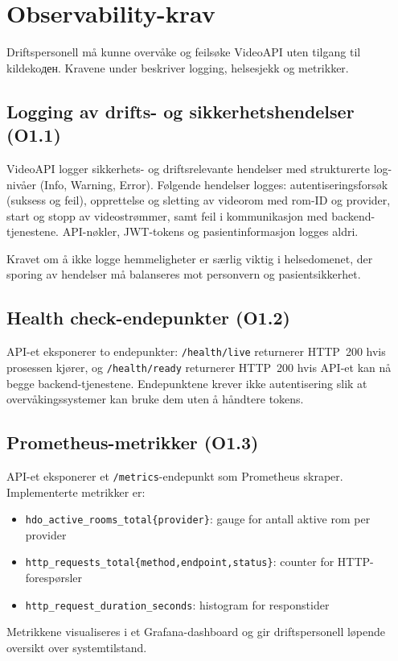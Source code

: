 \section{Observability-krav}
\label{sec:krav-observability}

Driftspersonell må kunne overvåke og feilsøke VideoAPI uten 
tilgang til kildekoден. Kravene under beskriver logging, 
helsesjekk og metrikker.

\subsection{Logging av drifts- og sikkerhetshendelser (O1.1)}
\label{subsec:krav-o11}

VideoAPI logger sikkerhets- og driftsrelevante hendelser med 
strukturerte log-nivåer (Info, Warning, Error). Følgende 
hendelser logges: autentiseringsforsøk (suksess og feil), 
opprettelse og sletting av videorom med rom-ID og provider, 
start og stopp av videostrømmer, samt feil i kommunikasjon 
med backend-tjenestene. API-nøkler, JWT-tokens og 
pasientinformasjon logges aldri.

Kravet om å ikke logge hemmeligheter er særlig viktig i 
helsedomenet, der sporing av hendelser må balanseres mot 
personvern og pasientsikkerhet.

\subsection{Health check-endepunkter (O1.2)}
\label{subsec:krav-o12}

API-et eksponerer to endepunkter: \texttt{/health/live} 
returnerer HTTP~200 hvis prosessen kjører, og 
\texttt{/health/ready} returnerer HTTP~200 hvis API-et 
kan nå begge backend-tjenestene. Endepunktene krever ikke 
autentisering slik at overvåkingssystemer kan bruke dem 
uten å håndtere tokens.

\subsection{Prometheus-metrikker (O1.3)}
\label{subsec:krav-o13}

API-et eksponerer et \texttt{/metrics}-endepunkt som 
Prometheus skraper. Implementerte metrikker er:

\begin{itemize}
    \item \texttt{hdo\_active\_rooms\_total\{provider\}}: 
          gauge for antall aktive rom per provider
    \item \texttt{http\_requests\_total\{method,endpoint,status\}}: 
          counter for HTTP-forespørsler
    \item \texttt{http\_request\_duration\_seconds}: 
          histogram for responstider
\end{itemize}

Metrikkene visualiseres i et Grafana-dashboard og gir 
driftspersonell løpende oversikt over systemtilstand.